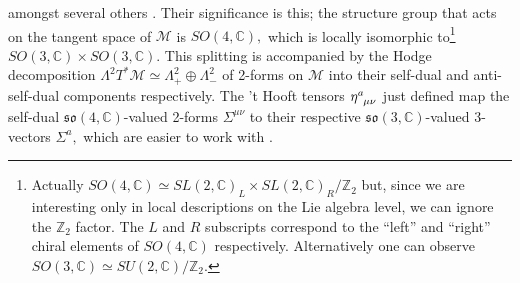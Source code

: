 \documentclass[a4paper,12pt, onecolumn, notitlepage]{article}
\theoremstyle{definition}
\theoremstyle{remark}
\newcommand{\m}{\mu}
\newcommand{\n}{\nu}
\newcommand{\hooft}[3]{\eta\indices{^{#1}_{#2}_{#3}}}
\begin{document}
amongst several others \cite{hooft_1976}. Their significance is this; the structure group that acts on the tangent space of $\mathcal{M}$ is $SO(4,\mathbb{C}),$ which is locally isomorphic to\footnote{Actually $SO(4,\mathbb{C}) \simeq SL(2,\mathbb{C})_{L}\times SL(2,\mathbb{C})_{R}/\mathbb{Z}_{2}$ but, since we are interesting only in local descriptions on the Lie algebra level, we can ignore the $\mathbb{Z}_{2}$ factor. The $L$ and $R$ subscripts correspond to the ``left'' and ``right'' chiral elements of $SO(4,\mathbb{C})$ respectively. Alternatively one can observe $SO(3,\mathbb{C})\simeq SU(2,\mathbb{C})/\mathbb{Z}_{2}.$} $SO(3,\mathbb{C})\times SO(3,\mathbb{C}).$ This splitting is accompanied by the Hodge decomposition $\Lambda^{2}T^{\ast}\mathcal{M}\simeq\Lambda_{+}^{2}\oplus\Lambda^{2}_{-}$ of 2-forms on $\mathcal{M}$ into their self-dual and anti-self-dual components respectively. The 't Hooft tensors $\hooft{a}{\m}{\n}$ just defined map the self-dual $\mathfrak{so}(4,\mathbb{C})$-valued 2-forms $\Sigma^{\m\n}$ to their respective $\mathfrak{so}(3,\mathbb{C})$-valued 3-vectors $\Sigma^{a},$ which are easier to work with \cite{hooft_1976}.\\
\end{document}
